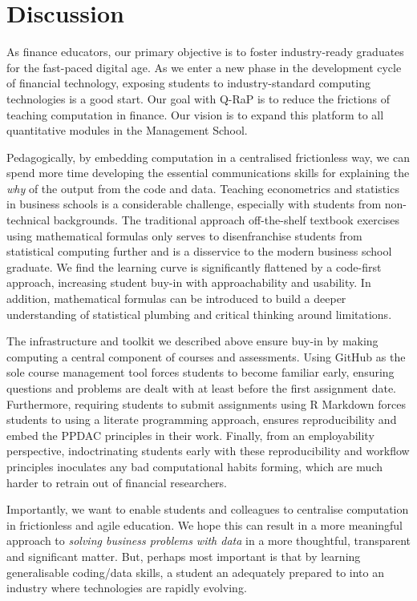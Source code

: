 \documentclass{article}
\begin{document}
\hypertarget{discussion}{%
\section{Discussion}\label{discussion}}

As finance educators, our primary objective is to foster industry-ready
graduates for the fast-paced digital age. As we enter a new phase in the
development cycle of financial technology, exposing students to
industry-standard computing technologies is a good start. Our goal with
Q-RaP is to reduce the frictions of teaching computation in finance. Our
vision is to expand this platform to all quantitative modules in the
Management School.

Pedagogically, by embedding computation in a centralised frictionless
way, we can spend more time developing the essential communications
skills for explaining the \emph{why} of the output from the code and
data. Teaching econometrics and statistics in business schools is a
considerable challenge, especially with students from non-technical
backgrounds. The traditional approach off-the-shelf textbook exercises
using mathematical formulas only serves to disenfranchise students from
statistical computing further and is a disservice to the modern business
school graduate. We find the learning curve is significantly flattened
by a code-first approach, increasing student buy-in with approachability
and usability. In addition, mathematical formulas can be introduced to
build a deeper understanding of statistical plumbing and critical
thinking around limitations.

The infrastructure and toolkit we described above ensure buy-in by
making computing a central component of courses and assessments. Using
GitHub as the sole course management tool forces students to become
familiar early, ensuring questions and problems are dealt with at least
before the first assignment date. Furthermore, requiring students to
submit assignments using R Markdown forces students to using a literate
programming approach, ensures reproducibility and embed the PPDAC
principles in their work. Finally, from an employability perspective,
indoctrinating students early with these reproducibility and workflow
principles inoculates any bad computational habits forming, which are
much harder to retrain out of financial researchers.

Importantly, we want to enable students and colleagues to centralise
computation in frictionless and agile education. We hope this can result
in a more meaningful approach to \emph{solving business problems with
data} in a more thoughtful, transparent and significant matter. But,
perhaps most important is that by learning generalisable coding/data
skills, a student an adequately prepared to into an industry where
technologies are rapidly evolving.
\end{document}
